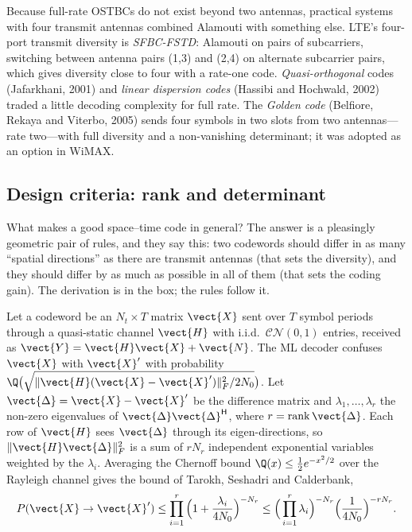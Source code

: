 Because full-rate OSTBCs do not exist beyond two antennas, practical systems with four transmit
antennas combined Alamouti with something else. LTE's four-port transmit diversity is
\emph{SFBC-FSTD}: Alamouti on pairs of subcarriers, switching between antenna pairs (1,3) and (2,4)
on alternate subcarrier pairs, which gives diversity close to four with a rate-one code.
\emph{Quasi-orthogonal} codes (Jafarkhani, 2001) and \emph{linear dispersion codes} (Hassibi and
Hochwald, 2002) traded a little decoding complexity for full rate. The \emph{Golden code} (Belfiore,
Rekaya and Viterbo, 2005) sends four symbols in two slots from two antennas---rate two---with full
diversity and a non-vanishing determinant; it was adopted as an option in WiMAX.

\subsection{Design criteria: rank and determinant}

What makes a good space--time code in general? The answer is a pleasingly geometric pair of rules,
and they say this: two codewords should differ in as many ``spatial directions'' as there are
transmit antennas (that sets the diversity), and they should differ by as much as possible in all of
them (that sets the coding gain). The derivation is in the box; the rules follow it.

\begin{deeper}
Let a codeword be an $N_t\times T$ matrix $\vect{X}$ sent over $T$ symbol periods through a
quasi-static channel $\vect{H}$ with i.i.d.\ $\mathcal{CN}(0,1)$ entries, received as
$\vect{Y}=\vect{H}\vect{X}+\vect{N}$. The ML decoder confuses $\vect{X}$ with $\vect{X}'$ with
probability $\Q\big(\sqrt{\|\vect{H}(\vect{X}-\vect{X}')\|_F^2/2N_0}\big)$. Let
$\vect{\Delta}=\vect{X}-\vect{X}'$ be the difference matrix and $\lambda_1,\dots,\lambda_r$ the non-zero
eigenvalues of $\vect{\Delta}\vect{\Delta}^{\mathsf H}$, where $r=\operatorname{rank}\vect{\Delta}$.
Each row of $\vect{H}$ sees $\vect{\Delta}$ through its eigen-directions, so
$\|\vect{H}\vect{\Delta}\|_F^2$ is a sum of $rN_r$ independent exponential variables weighted by the
$\lambda_i$. Averaging the Chernoff bound $\Q(x)\le\tfrac12e^{-x^2/2}$ over the Rayleigh channel
gives the  bound of Tarokh, Seshadri and Calderbank,
\begin{equation}
P(\vect{X}\to\vect{X}')\le\prod_{i=1}^{r}\Big(1+\frac{\lambda_i}{4N_0}\Big)^{-N_r}
\le\Big(\prod_{i=1}^r\lambda_i\Big)^{-N_r}\Big(\frac{1}{4N_0}\Big)^{-rN_r}.
\label{eq:ch19:pep}
\end{equation}
\end{deeper}

